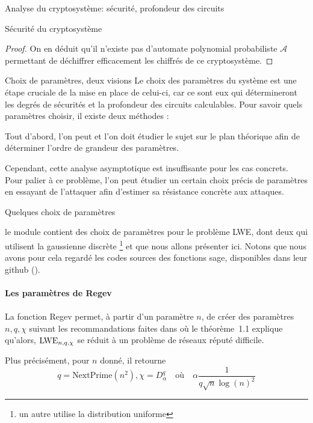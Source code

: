 \begin{section}{Analyse du cryptosystème: sécurité, profondeur des circuits}
\begin{subsection}{Sécurité du cryptosystème}
\begin{proof}
	On en déduit qu'il n'existe pas d'automate polynomial probabiliste
	$\mathcal{A}$ permettant de déchiffrer efficacement les chiffrés de ce cryptosystème.
	\end{proof}
	
	\end{subsection}
	\begin{subsection}{Choix de paramètres, deux visions}
	Le choix des paramètres du système est une étape cruciale de la mise en place de celui-ci,
	car ce sont eux qui détermineront les degrés de sécurités et la profondeur des circuits calculables.
	Pour savoir quels paramètres choisir, il existe deux méthodes :
	
	Tout d'abord, l'on peut et l'on doit étudier le sujet sur le plan théorique afin de déterminer
	l'ordre de grandeur des paramètres.
	
	Cependant, cette analyse asymptotique est insuffisante pour les cas concrets. Pour palier à ce
	problème, l'on peut étudier un certain choix précis de paramètres en essayant de l'attaquer afin
	d'estimer sa résistance concrète aux attaques.
	
	\begin{subsubsection}{Quelques choix de paramètres}

	le module  contient des choix de paramètres pour
	le problème LWE, dont deux qui utilisent la gaussienne discrète
	\footnote{un autre utilise la distribution uniforme}
	et que nous allons présenter ici. Notons que nous avons pour cela 
	regardé les codes 
	sources des fonctions sage, disponibles dans leur github (\cite{sage}).

	\paragraph{}
	\textbf{Les paramètres de Regev}
	\paragraph{}

	La fonction Regev permet, à partir d'un paramètre $n$, de 
	créer des paramètres $n, q, \chi$ suivant les recommandations  
	faites dans \cite{STOC:Regev05} où le théorème~1.1 explique 
	qu'alors, $\text{LWE}_{n,q,\chi}$ se réduit à un problème de réseaux réputé 
	difficile.

	Plus précisément, pour $n$ donné, il retourne
	\[q = \text{NextPrime}(n^2), \chi = D^q_\alpha\quad\text{où}\quad \alpha \frac{1}{q\sqrt{n} \log(n)^2}\]


\end{subsubsection}
\end{subsection}
\end{section}
